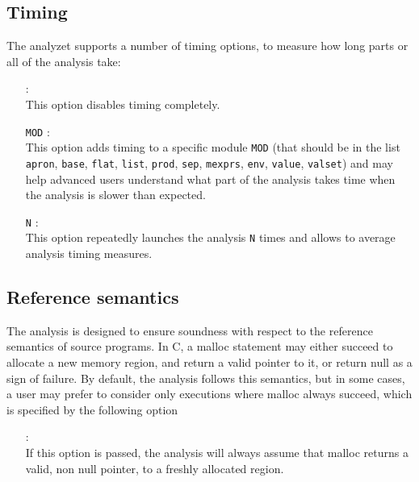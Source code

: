 \subsection{Timing}
\label{s:opt:timing}
The \memcad analyzet supports a number of timing options, to measure
how long parts or all of the analysis take:
\begin{itemize}
\item[\doption{-no-timing}]: \\
  This option disables timing completely.
\item[\doption{-timing} \texttt{MOD}] \optadv: \\
  This option adds timing to a specific module \texttt{MOD}
  (that should be in the list \texttt{apron}, \texttt{base},
  \texttt{flat}, \texttt{list}, \texttt{prod}, \texttt{sep},
  \texttt{mexprs}, \texttt{env}, \texttt{value}, \texttt{valset})
  and may help advanced users understand what part of the analysis
  takes time when the analysis is slower than expected.
\item[\doption{-stress-test} \texttt{N}]: \\
  This option repeatedly launches the analysis \texttt{N} times
  and allows to average analysis timing measures.
\end{itemize}

\subsection{Reference semantics}
\label{s:opt:sem}
The analysis is designed to ensure soundness with respect to the
reference semantics of source programs.
In C, a malloc statement may either succeed to allocate a new memory
region, and return a valid pointer to it, or return null as a sign of
failure.
By default, the analysis follows this semantics, but in some cases, a
user may prefer to consider only executions where malloc always
succeed, which is specified by the following option
\begin{itemize}
\item[\doption{-malloc-non0}] \optadv: \\
  If this option is passed, the analysis will always assume that
  malloc returns a valid, non null pointer, to a freshly allocated
  region.
\end{itemize}

